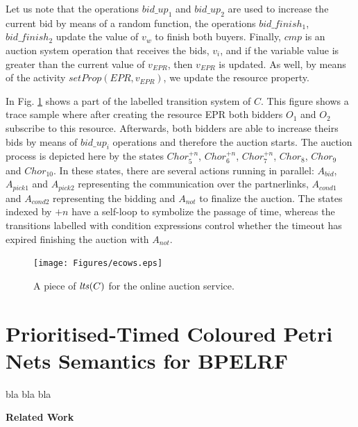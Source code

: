 \normalsize
\vspace{-1.0cm}

Let us note that the operations $bid\_up_{1}$ and $bid\_up_{2}$ are used to increase the current bid by means of a random function, the operations $bid\_finish_{1}$, $bid\_finish_{2}$ update the value of $v_w$ to finish both buyers. Finally, $cmp$ is an auction system operation that receives the bids, $v_i$, and if the variable value is greater than the current value of $v_{EPR}$, then $v_{EPR}$ is updated. As well, by means of the activity $setProp(EPR,v_{EPR})$, we update the resource property.

In Fig. \ref{auct} shows a part of the labelled transition system of $C$. This figure shows a trace sample where after creating the resource EPR both bidders $O_1$ and $O_2$ subscribe to this resource. Afterwards, both bidders are able to increase theirs bids by means of $bid\_up_i$ operations and therefore the auction starts. The auction process is depicted here by the states $Chor_{5}^{+n}$, $Chor_{6}^{+n}$, $Chor_{7}^{+n}$, $Chor_{8}$, $Chor_{9}$ and $Chor_{10}$. In these states, there are several actions running in parallel: $A_{bid}$, $A_{pick1}$ and $A_{pick2}$ representing the communication over the partnerlinks, $A_{cond1}$ and $A_{cond2}$ representing the bidding and $A_{not}$ to finalize the auction. The states indexed by $+n$ have a self-loop to symbolize the passage of time, whereas the transitions labelled with condition expressions control whether the timeout has expired finishing the auction with $A_{not}$.

\begin{figure}
\begin{center}
    \texttt{[image: Figures/ecows.eps]}
  \caption{A piece of ${\it lts}(C)$ for the online auction service.}
  \label{auct}
\end{center}
\end{figure}

\newpage

\section{Prioritised-Timed Coloured Petri Nets Semantics for BPELRF}\label{semantics}

bla bla bla

{\bf Related Work}

